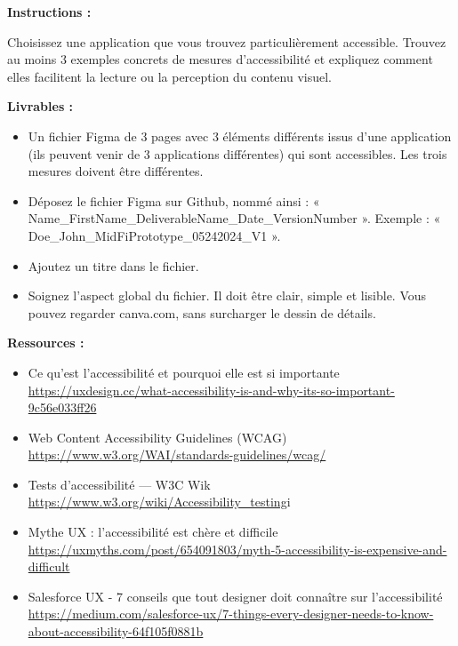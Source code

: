 \makeheaderfiles

\textbf{Instructions :}

Choisissez une application que vous trouvez particulièrement accessible. Trouvez au moins 3 exemples concrets de mesures d'accessibilité et expliquez comment elles facilitent la lecture ou la perception du contenu visuel.

\textbf{Livrables :}

\begin{itemize}
\item Un fichier Figma de 3 pages avec 3 éléments différents issus d'une application (ils peuvent venir de 3 applications différentes) qui sont accessibles. Les trois mesures doivent être différentes.
\item Déposez le fichier Figma sur Github, nommé ainsi : « Name\_FirstName\_DeliverableName\_Date\_VersionNumber ». Exemple : « Doe\_John\_MidFiPrototype\_05242024\_V1 ».
\item Ajoutez un titre dans le fichier.
\item Soignez l'aspect global du fichier. Il doit être clair, simple et lisible. Vous pouvez regarder canva.com, sans surcharger le dessin de détails.
\end{itemize}

\textbf{Ressources :}

\begin{itemize}
\item Ce qu'est l'accessibilité et pourquoi elle est si importante \url{https://uxdesign.cc/what-accessibility-is-and-why-its-so-important-9c56e033ff26}
\item Web Content Accessibility Guidelines (WCAG) \url{https://www.w3.org/WAI/standards-guidelines/wcag/}
\item Tests d'accessibilité  ---  W3C Wik \url{https://www.w3.org/wiki/Accessibility_testing}i
\item Mythe UX : l'accessibilité est chère et difficile \url{https://uxmyths.com/post/654091803/myth-5-accessibility-is-expensive-and-difficult}
\item Salesforce UX - 7 conseils que tout designer doit connaître sur l'accessibilité \url{https://medium.com/salesforce-ux/7-things-every-designer-needs-to-know-about-accessibility-64f105f0881b}
\end{itemize}

